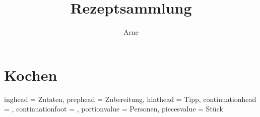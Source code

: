 \documentclass[%
a4paper,
11pt
]{article}
\title{Rezeptsammlung}
\author{Arne}
\numberwithin{page}{section}
\begin{document}


\tableofcontents

\vspace{5em}


\section{Kochen}
\setcounter{page}{1}
\pagebreak


\setHeadlines
{%
    inghead = Zutaten,
    prephead = Zubereitung,
    hinthead = Tipp,
    continuationhead =  ,%
    continuationfoot = ,%
    portionvalue = Personen,
    piecesvalue = Stück
}
\end{document}

